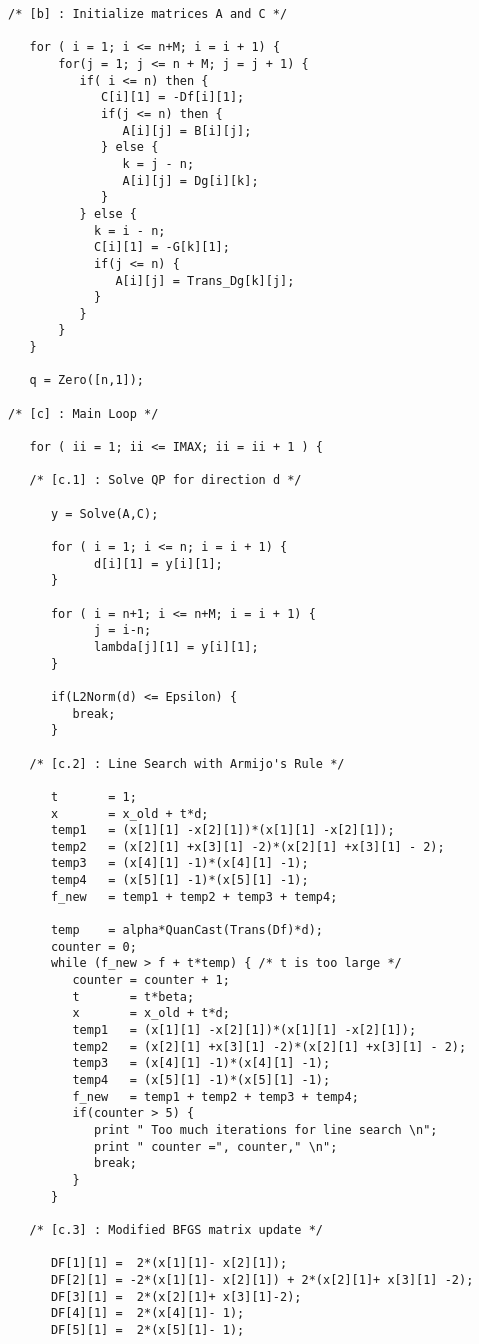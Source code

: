 \begin{footnotesize}
\begin{verbatim}
/* [b] : Initialize matrices A and C */

   for ( i = 1; i <= n+M; i = i + 1) {
       for(j = 1; j <= n + M; j = j + 1) {
          if( i <= n) then {
             C[i][1] = -Df[i][1];
             if(j <= n) then {
                A[i][j] = B[i][j];
             } else {
                k = j - n;
                A[i][j] = Dg[i][k];
             }
          } else {
            k = i - n;
            C[i][1] = -G[k][1];
            if(j <= n) {
               A[i][j] = Trans_Dg[k][j];
            }
          }
       }
   }

   q = Zero([n,1]);

/* [c] : Main Loop */

   for ( ii = 1; ii <= IMAX; ii = ii + 1 ) {

   /* [c.1] : Solve QP for direction d */

      y = Solve(A,C);
        
      for ( i = 1; i <= n; i = i + 1) {
            d[i][1] = y[i][1];
      }

      for ( i = n+1; i <= n+M; i = i + 1) {
            j = i-n;
            lambda[j][1] = y[i][1];
      }

      if(L2Norm(d) <= Epsilon) {
         break;
      }

   /* [c.2] : Line Search with Armijo's Rule */

      t       = 1;
      x       = x_old + t*d;
      temp1   = (x[1][1] -x[2][1])*(x[1][1] -x[2][1]);
      temp2   = (x[2][1] +x[3][1] -2)*(x[2][1] +x[3][1] - 2);
      temp3   = (x[4][1] -1)*(x[4][1] -1);
      temp4   = (x[5][1] -1)*(x[5][1] -1);
      f_new   = temp1 + temp2 + temp3 + temp4;

      temp    = alpha*QuanCast(Trans(Df)*d);
      counter = 0;
      while (f_new > f + t*temp) { /* t is too large */
         counter = counter + 1;
         t       = t*beta;
         x       = x_old + t*d;
         temp1   = (x[1][1] -x[2][1])*(x[1][1] -x[2][1]);
         temp2   = (x[2][1] +x[3][1] -2)*(x[2][1] +x[3][1] - 2);
         temp3   = (x[4][1] -1)*(x[4][1] -1);
         temp4   = (x[5][1] -1)*(x[5][1] -1);
         f_new   = temp1 + temp2 + temp3 + temp4;
         if(counter > 5) {
            print " Too much iterations for line search \n";
            print " counter =", counter," \n";
            break;
         }
      }

   /* [c.3] : Modified BFGS matrix update */

      DF[1][1] =  2*(x[1][1]- x[2][1]);
      DF[2][1] = -2*(x[1][1]- x[2][1]) + 2*(x[2][1]+ x[3][1] -2);
      DF[3][1] =  2*(x[2][1]+ x[3][1]-2);
      DF[4][1] =  2*(x[4][1]- 1);
      DF[5][1] =  2*(x[5][1]- 1);


\end{verbatim}
\end{footnotesize}
